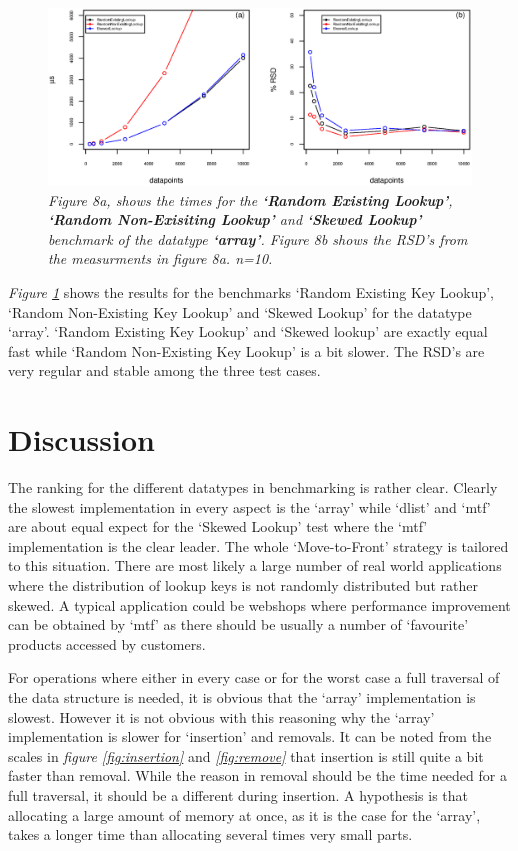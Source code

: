 \documentclass[a4paper,11pt,twoside]{article}
\begin{document}
\begin{figure}[H] 
\centering 
\includegraphics[width=\textwidth]{figures/fig8.eps}
\caption{\textit{Figure 8a, shows the times for the \textbf{`Random Existing
    Lookup'}, \textbf{`Random Non-Exisiting Lookup'} and
  \textbf{`Skewed Lookup'} benchmark of the datatype \textbf{`array'}. Figure 8b shows the RSD's from the measurments
in figure 8a. n=10.}}
\label{fig:array}
\end{figure}

\textit{Figure \ref{fig:array}} shows the results for the benchmarks
`Random Existing Key Lookup', `Random Non-Existing Key Lookup' and
`Skewed Lookup' for the datatype `array'. `Random Existing Key Lookup' and
`Skewed lookup' are exactly equal fast while `Random Non-Existing Key
Lookup' is a bit slower. The RSD's are very regular and stable among
the three test cases.


\section{Discussion}
The ranking for the different datatypes in benchmarking is rather
clear. Clearly the slowest implementation in every aspect is the
`array' while `dlist' and `mtf' are about equal expect for the
`Skewed Lookup' test where the `mtf' implementation is the clear
leader. The whole `Move-to-Front' strategy is tailored to this
situation. There are most likely a large number of real world
applications where the distribution of lookup keys is not randomly
distributed but rather skewed. A typical application could be webshops
where performance improvement can be obtained by `mtf' as there should
be usually a number of `favourite' products accessed by customers.

For operations where either in every case or for the worst case a full
traversal of the data structure is needed, it is obvious that the
`array' implementation is slowest. However it is not obvious with this
reasoning why the `array' implementation is slower for `insertion' and
removals. It can be noted from the scales in \textit{figure
  \ref{fig:insertion}} and \textit{\ref{fig:remove}} that insertion is
still quite a bit faster than removal. While the reason in removal
should be the time needed for a full traversal, it should be a
different during insertion. A hypothesis is that allocating a large
amount of memory at once, as it is the case for the `array',  takes 
a longer time than allocating several times very small parts. 
\end{document}
